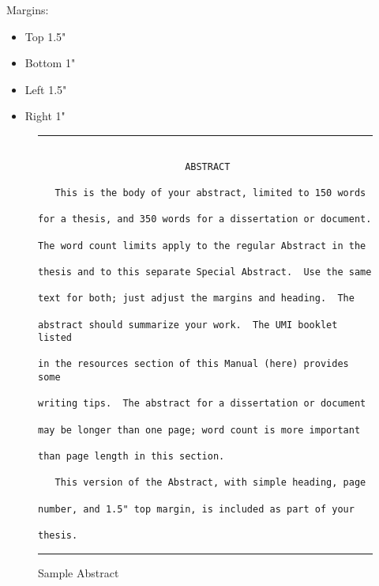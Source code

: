 \documentclass[draft]{ua-thesis}
\begin{document}
Margins:
\begin{itemize}
   \item Top 1.5"
   \item Bottom 1"
   \item Left 1.5"
   \item Right 1"
\end{itemize}

\begin{figure}
\hrule
\begin{verbatim}

                          ABSTRACT

   This is the body of your abstract, limited to 150 words

for a thesis, and 350 words for a dissertation or document.

The word count limits apply to the regular Abstract in the

thesis and to this separate Special Abstract.  Use the same

text for both; just adjust the margins and heading.  The

abstract should summarize your work.  The UMI booklet listed

in the resources section of this Manual (here) provides some

writing tips.  The abstract for a dissertation or document

may be longer than one page; word count is more important

than page length in this section.

   This version of the Abstract, with simple heading, page

number, and 1.5" top margin, is included as part of your

thesis.

\end{verbatim}
\hrule
\caption{Sample Abstract} \label{f10}
\end{figure}
\end{document}
